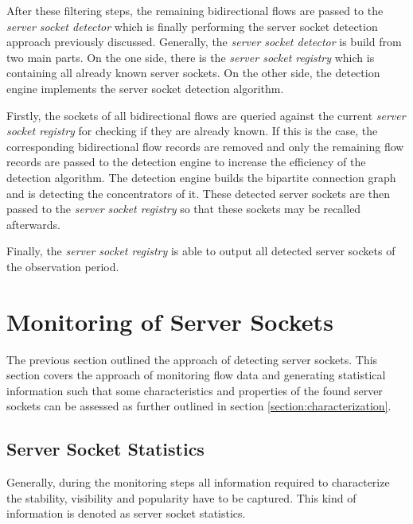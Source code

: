 After these filtering steps, the remaining bidirectional flows are passed to the 
\emph{server socket detector} which is finally performing the 
\gls{server socket} detection approach previously discussed. Generally, the 
\emph{server socket detector} is build from two main parts. 
On the one side, there is the \emph{server socket registry} which is 
containing all already known \glspl{server socket}. On the other side, the 
detection engine implements the \gls{server socket} detection algorithm. 

Firstly, the sockets of all bidirectional flows are queried against the current 
\emph{server socket registry} for checking if they are already known. If this is 
the case, the corresponding bidirectional flow records are removed and only the 
remaining flow records are passed to the detection engine to increase the 
efficiency of the detection algorithm. 
The detection engine builds the bipartite connection 
graph and is detecting the concentrators of it. These detected \glspl{server 
socket} are then passed to the \emph{server socket registry} so that these 
sockets may be recalled afterwards. 

Finally, the \emph{server socket registry} is able to output all detected 
\glspl{server socket} of the observation period. 

\newpage
\section{Monitoring of Server Sockets 
\label{section:socket_tracking}}

The previous section outlined the approach of detecting \glspl{server socket}. 
This section covers the approach of monitoring flow data and generating 
statistical information such that some characteristics and properties of the 
found \glspl{server socket} can be assessed as further outlined in section 
\ref{section:characterization}.

\subsection{Server Socket Statistics}

Generally, during the monitoring steps all information required to 
characterize the stability, visibility and popularity have to be captured. This 
kind of information is denoted as \gls{server socket} statistics. 

